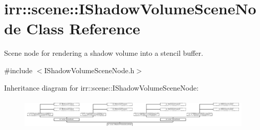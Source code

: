 \hypertarget{classirr_1_1scene_1_1IShadowVolumeSceneNode}{}\section{irr\+:\+:scene\+:\+:I\+Shadow\+Volume\+Scene\+Node Class Reference}
\label{classirr_1_1scene_1_1IShadowVolumeSceneNode}


Scene node for rendering a shadow volume into a stencil buffer.  




{\ttfamily \#include $<$I\+Shadow\+Volume\+Scene\+Node.\+h$>$}

Inheritance diagram for irr\+:\+:scene\+:\+:I\+Shadow\+Volume\+Scene\+Node\+:\begin{figure}[H]
\begin{center}
\leavevmode
\includegraphics[height=1.489362cm]{classirr_1_1scene_1_1IShadowVolumeSceneNode}
\end{center}
\end{figure}
